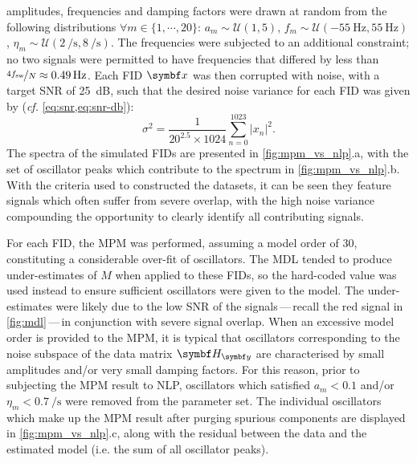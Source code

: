 amplitudes, frequencies and damping factors were drawn at random from the
following distributions
$\forall m \in \lbrace 1, \cdots, 20\rbrace$:
$a_m \sim \mathcal{U}(1, 5)$, $f_m \sim \mathcal{U}(\qty{-55}{\hertz},
\qty{55}{\hertz})$, $\eta_m \sim \mathcal{U}(\qty{2}{\per\second},
\qty{8}{\per\second})$. The frequencies were subjected to an additional
constraint; no two signals were permitted to have frequencies that
differed by less than $\nicefrac{4 f_{\mathrm{sw}}}{N} \approx \qty{0.49}{\hertz}$.
Each \ac{FID} $\bx$ was then corrupted with noise, with a target
\ac{SNR} of \qty{25}{\deci\bel}, such that the desired noise variance for each
\ac{FID} was given by (\emph{cf.} \cref{eq:snr,eq:snr-db}):
\begin{equation}
    \sigma^2 = \frac{1}{20^{2.5} \times 1024}
        \sum_{n=0}^{1023} \lvert x_n \rvert^2.
\end{equation}
The spectra of the simulated \acp{FID} are presented in
\cref{fig:mpm_vs_nlp}.a, with the set of oscillator peaks which contribute
to the spectrum in \cref{fig:mpm_vs_nlp}.b. With the criteria used to
constructed the datasets, it can be seen they feature signals which often
suffer from severe overlap, with the high noise variance compounding the
opportunity to clearly identify all contributing signals.

For each \ac{FID}, the \ac{MPM} was performed, assuming a model order of
30, constituting a considerable over-fit of oscillators. The \ac{MDL} tended to
produce under-estimates of $M$ when applied to these \acp{FID}, so the
hard-coded value was used instead to ensure sufficient oscillators were given
to the model. The under-estimates were likely due to the
low \ac{SNR} of the signals\,---\,recall the red signal in \cref{fig:mdl}\,---\,in
conjunction with severe signal overlap. When an excessive model order is
provided to the \ac{MPM}, it is typical that oscillators corresponding to the
noise subspace of the data matrix $\Hy$ are characterised by small amplitudes
and/or very small damping factors. For this reason, prior to subjecting the
\ac{MPM} result to \ac{NLP}, oscillators which satisfied $a_m < 0.1$ and/or
$\eta_m < \qty{0.7}{\per\second}$ were removed from the parameter set. The
individual oscillators which make up the \ac{MPM} result after purging spurious
components are displayed in \cref{fig:mpm_vs_nlp}.c, along with the
residual between the data and the estimated model (i.e. the sum of all
oscillator peaks).


